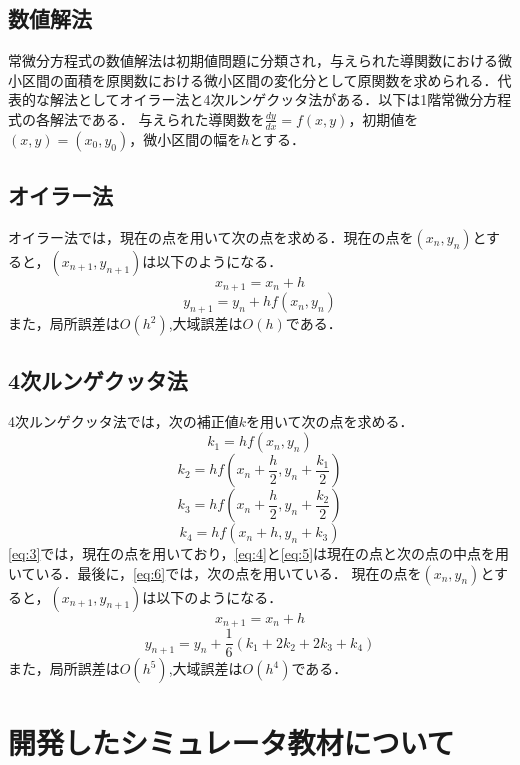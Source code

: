 \documentclass[a4paper, 12pt]{ltjsarticle}
\begin{document}
\subsection{数値解法}
常微分方程式の数値解法は初期値問題に分類され，与えられた導関数における微小区間の面積を原関数における微小区間の変化分として原関数を求められる．代表的な解法としてオイラー法と4次ルンゲクッタ法がある．以下は1階常微分方程式の各解法である．
与えられた導関数を$\frac{dy}{dx}=f(x,y)$，初期値を$(x,y)=(x_0,y_0)$，微小区間の幅を$h$とする．
\subsection{オイラー法}
オイラー法では，現在の点を用いて次の点を求める．現在の点を$(x_n,y_n)$とすると，$(x_{n+1},y_{n+1})$は以下のようになる．
\begin{equation}
  x_{n+1}=x_n+h
\end{equation}
\begin{equation}
  y_{n+1}=y_n+hf(x_n,y_n)
\end{equation}
また，局所誤差は$O(h^2)$,大域誤差は$O(h)$である．
\clearpage
\subsection{4次ルンゲクッタ法}
4次ルンゲクッタ法では，次の補正値$k$を用いて次の点を求める．
\begin{equation}
  k_1=hf(x_n,y_n)\label{eq:3}
\end{equation}
\begin{equation}
  k_2=hf(x_n+\frac{h}{2},y_n+\frac{k_1}{2})\label{eq:4}
\end{equation}
\begin{equation}
  k_3=hf(x_n+\frac{h}{2},y_n+\frac{k_2}{2})\label{eq:5}
\end{equation}
\begin{equation}
  k_4=hf(x_n+h,y_n+k_3)\label{eq:6}
\end{equation}
\eqref{eq:3}では，現在の点を用いており，\eqref{eq:4}と\eqref{eq:5}は現在の点と次の点の中点を用いている．最後に，\eqref{eq:6}では，次の点を用いている．
現在の点を$(x_n,y_n)$とすると，$(x_{n+1},y_{n+1})$は以下のようになる．
\begin{equation}
  x_{n+1}=x_n+h
\end{equation}
\begin{equation}
  y_{n+1}=y_n+\frac{1}{6}(k_1+2k_2+2k_3+k_4)
\end{equation}
また，局所誤差は$O(h^5)$,大域誤差は$O(h^4)$である．
\clearpage
\section{開発したシミュレータ教材について}
\end{document}
